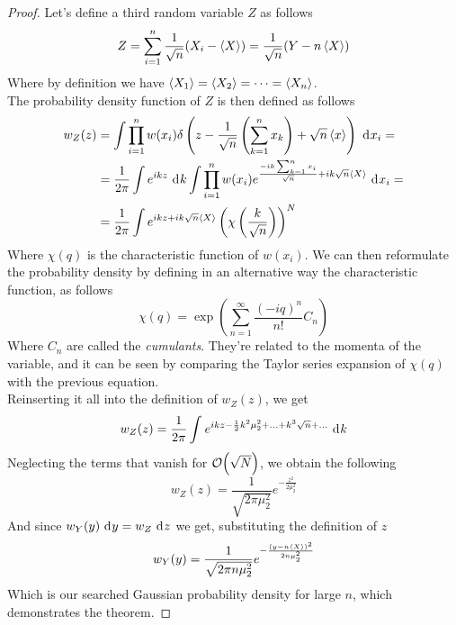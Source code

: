 \documentclass[../qm.tex]{subfiles}
\begin{document}
	\begin{proof}
		Let's define a third random variable $Z$ as follows
		\begin{equation*}
			Z=\sum_{i=1}^n\frac{1}{\sqrt{n}}(X_i-\expval{X})=\frac{1}{\sqrt{n}}(Y-n\expval{X})
		\end{equation*}
		Where by definition we have $\expval{X_1}=\expval{X_2}=\cdots=\expval{X_n}$.\\
		The probability density function of $Z$ is then defined as follows
		\begin{equation*}
			\begin{aligned}
				w_Z(z)&=\int \prod_{i=1}^nw(x_i)\delta\left( z-\frac{1}{\sqrt{n}}\left( \sum_{k=1}^nx_k \right)+\sqrt{n}\expval{x} \right)\ \mathrm{d}^{}x_i=\\
				&=\frac{1}{2\pi}\int e^{ikz}\ \mathrm{d}^{}k\int\prod_{i=1}^nw(x_i)e^{\frac{-ik\sum_{k=1}^nx_i}{\sqrt{n}}+ik\sqrt{n}\expval{X}}\ \mathrm{d}^{}x_i=\\
				&=\frac{1}{2\pi}\int e^{ikz+ik\sqrt{n}\expval{X}}\left( \chi\left( \frac{k}{\sqrt{n}} \right) \right)^N
			\end{aligned}
		\end{equation*}
		Where $\chi(q)$ is the characteristic function of $w(x_i)$. We can then reformulate the probability density by defining in an alternative way the characteristic function, as follows
		\begin{equation*}
			\chi(q)=\exp\left( \sum_{n=1}^{\infty}\frac{(-iq)^n}{n!}C_n \right)
		\end{equation*}
		Where $C_n$ are called the \textit{cumulants}. They're related to the momenta of the variable, and it can be seen by comparing the Taylor series expansion of $\chi(q)$ with the previous equation.\\
		Reinserting it all into the definition of $w_Z(z)$, we get
		\begin{equation*}
			w_Z(z)=\frac{1}{2\pi}\int_{}^{}e^{ikz-\frac{1}{2}k^2\mu_2^2+\ldots+k^3\sqrt{n}+\ldots}\ \mathrm{d}^{}k
		\end{equation*}
		Neglecting the terms that vanish for $\order{\sqrt{N}}$, we obtain the following
		\begin{equation*}
			w_Z(z)=\frac{1}{\sqrt{2\pi\mu_2^2}}e^{-\frac{z^2}{2\mu_2^2}}
		\end{equation*}
		And since $w_Y(y)\ \mathrm{d}^{}y=w_Z\ \mathrm{d}^{}z$ we get, substituting the definition of $z$
		\begin{equation*}
			w_Y(y)=\frac{1}{\sqrt{2\pi n\mu_2^2}}e^{-\frac{(y-n\expval{X})^2}{2n\mu_2^2}}
		\end{equation*}
		Which is our searched Gaussian probability density for large $n$, which demonstrates the theorem.
	\end{proof}
\end{document}
